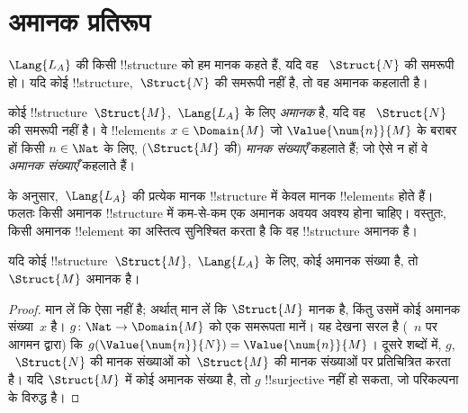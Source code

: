 \documentclass[../../../include/open-logic-section]{subfiles}
\begin{document}
\section{अमानक प्रतिरूप}

\begin{explain}
$\Lang{L_A}$ की किसी !!{structure} को हम मानक कहते हैं, यदि वह
~$\Struct{N}$ की समरूपी हो। यदि कोई !!{structure},~$\Struct{N}$ की समरूपी
नहीं है, तो वह अमानक कहलाती है।
\end{explain}

\begin{defn}
कोई !!{structure}~$\Struct{M}$,~$\Lang{L_A}$ के लिए \emph{अमानक} है, यदि वह
~$\Struct{N}$ की समरूपी नहीं है। वे !!{element}s $x \in
\Domain{M}$ जो $\Value{\num{n}}{M}$ के बराबर हों किसी $n \in
\Nat$ के लिए,
($\Struct{M}$ की) \emph{मानक संख्याएँ} कहलाते हैं; जो ऐसे न हों वे
\emph{अमानक संख्याएँ} कहलाते हैं।
\end{defn}

\begin{explain}
 के अनुसार,~$\Lang{L_A}$ की प्रत्येक
मानक !!{structure} में केवल मानक !!{element}s होते हैं। फलतः किसी अमानक
!!{structure} में कम-से-कम एक अमानक अवयव अवश्य होना चाहिए। वस्तुतः, किसी
अमानक !!{element} का अस्तित्व सुनिश्चित करता है कि वह !!{structure} अमानक
है।
\end{explain}

\begin{prop}
यदि कोई !!{structure}~$\Struct{M}$,~$\Lang{L_A}$ के लिए, कोई अमानक संख्या
है, तो $\Struct{M}$ अमानक है।
\end{prop}

\begin{proof}
मान लें कि ऐसा नहीं है; अर्थात् मान लें कि $\Struct{M}$ मानक है, किंतु
उसमें कोई अमानक संख्या~$x$ है। $g\colon \Nat \to \Domain{M}$ को एक
समरूपता मानें। यह देखना सरल है (~$n$ पर आगमन द्वारा) कि
$g(\Value{\num{n}}{N}) = \Value{\num{n}}{M}$। दूसरे शब्दों में, $g$,
~$\Struct{N}$ की मानक संख्याओं को~$\Struct{M}$ की मानक संख्याओं पर
प्रतिचित्रित करता है। यदि $\Struct{M}$ में कोई अमानक संख्या है, तो $g$
!!{surjective} नहीं हो सकता, जो परिकल्पना के विरुद्ध है।
\end{proof}
\end{document}

